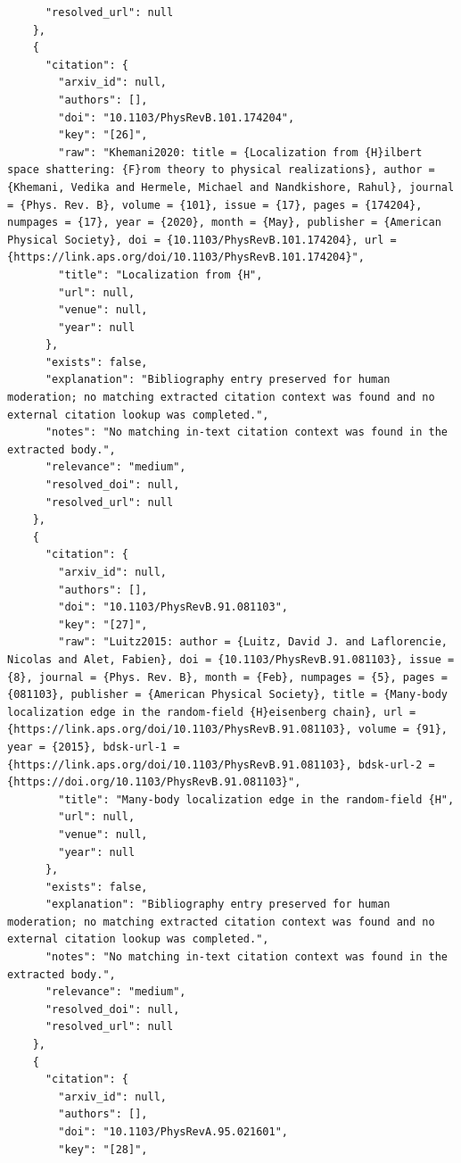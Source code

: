 \documentclass[11pt]{article}
\begin{document}
\begin{verbatim}
      "resolved_url": null
    },
    {
      "citation": {
        "arxiv_id": null,
        "authors": [],
        "doi": "10.1103/PhysRevB.101.174204",
        "key": "[26]",
        "raw": "Khemani2020: title = {Localization from {H}ilbert space shattering: {F}rom theory to physical realizations}, author = {Khemani, Vedika and Hermele, Michael and Nandkishore, Rahul}, journal = {Phys. Rev. B}, volume = {101}, issue = {17}, pages = {174204}, numpages = {17}, year = {2020}, month = {May}, publisher = {American Physical Society}, doi = {10.1103/PhysRevB.101.174204}, url = {https://link.aps.org/doi/10.1103/PhysRevB.101.174204}",
        "title": "Localization from {H",
        "url": null,
        "venue": null,
        "year": null
      },
      "exists": false,
      "explanation": "Bibliography entry preserved for human moderation; no matching extracted citation context was found and no external citation lookup was completed.",
      "notes": "No matching in-text citation context was found in the extracted body.",
      "relevance": "medium",
      "resolved_doi": null,
      "resolved_url": null
    },
    {
      "citation": {
        "arxiv_id": null,
        "authors": [],
        "doi": "10.1103/PhysRevB.91.081103",
        "key": "[27]",
        "raw": "Luitz2015: author = {Luitz, David J. and Laflorencie, Nicolas and Alet, Fabien}, doi = {10.1103/PhysRevB.91.081103}, issue = {8}, journal = {Phys. Rev. B}, month = {Feb}, numpages = {5}, pages = {081103}, publisher = {American Physical Society}, title = {Many-body localization edge in the random-field {H}eisenberg chain}, url = {https://link.aps.org/doi/10.1103/PhysRevB.91.081103}, volume = {91}, year = {2015}, bdsk-url-1 = {https://link.aps.org/doi/10.1103/PhysRevB.91.081103}, bdsk-url-2 = {https://doi.org/10.1103/PhysRevB.91.081103}",
        "title": "Many-body localization edge in the random-field {H",
        "url": null,
        "venue": null,
        "year": null
      },
      "exists": false,
      "explanation": "Bibliography entry preserved for human moderation; no matching extracted citation context was found and no external citation lookup was completed.",
      "notes": "No matching in-text citation context was found in the extracted body.",
      "relevance": "medium",
      "resolved_doi": null,
      "resolved_url": null
    },
    {
      "citation": {
        "arxiv_id": null,
        "authors": [],
        "doi": "10.1103/PhysRevA.95.021601",
        "key": "[28]",

\end{verbatim}
\end{document}
